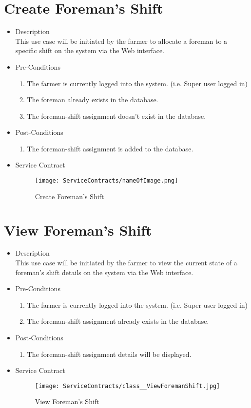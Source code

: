 \documentclass[11pt,fleqn]{book} %
\begin{document}
\section{Create Foreman’s Shift}
\begin{itemize}
	\item Description\\
	This use case will be initiated by the farmer to allocate a foreman to a specific shift on the system via the Web interface.
	\item Pre-Conditions
	\begin{enumerate}
		\item The farmer is currently logged into the system. (i.e. Super user logged in)
		\item The foreman already exists in the database. 
		\item The foreman-shift assignment doesn’t exist in the database.					
	\end{enumerate}
	\item Post-Conditions
	\begin{enumerate}
		\item The foreman-shift assignment is added to the database.
	\end{enumerate}
	\item Service Contract
	\begin{figure}
		\texttt{[image: ServiceContracts/nameOfImage.png]}
		\caption{Create Foreman’s Shift}
	\end{figure}
\end{itemize}

\section{View Foreman’s Shift}
\begin{itemize}
	\item Description\\
	This use case will be initiated by the farmer to view the current state of a foreman’s shift details on the system via the Web interface.
	\item Pre-Conditions
	\begin{enumerate}
		\item The farmer is currently logged into the system. (i.e. Super user logged in)
		\item The foreman-shift assignment already exists in the database.		
	\end{enumerate}
	\item Post-Conditions
	\begin{enumerate}
		\item The foreman-shift assignment details will be displayed.
	\end{enumerate}
	\item Service Contract
		\begin{figure}
			\texttt{[image: ServiceContracts/class\_\_ViewForemanShift.jpg]}
			\caption{View Foreman’s Shift}
		\end{figure}
\end{itemize}
\end{document}
